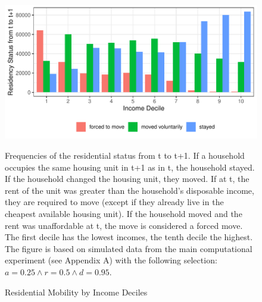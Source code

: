 \documentclass[a4paper,12pt]{article}
\begin{document}
\begin{figure}
\caption{Residential Mobility by Income Deciles}
\includegraphics[width=\textwidth]{./images/abm_05_mobility}

\tiny{Frequencies of the residential status from t to t+1. If a household occupies the same housing unit in t+1 as in t, the household stayed. If the household changed the housing unit, they moved. If at t, the rent of the unit was greater than the household's disposable income, they are required to move (except if they already live in the cheapest available housing unit). If the household moved and the rent was unaffordable at t, the move is considered a forced move. The first decile has the lowest incomes, the tenth decile the highest. The figure is based on simulated data from the main computational experiment (see Appendix A) with the following selection: $a = 0.25 \land r = 0.5 \land d = 0.95$.}
\label{fig:mobility}
\end{figure}
\end{document}
